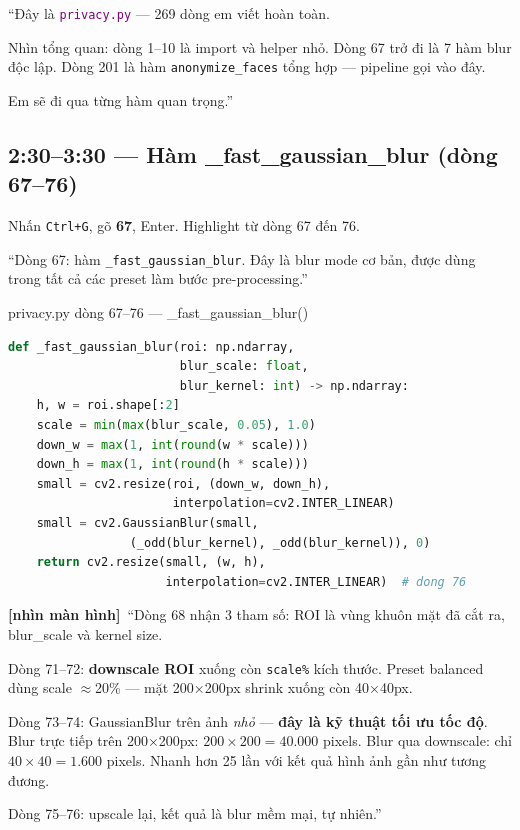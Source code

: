 \documentclass[12pt, a4paper]{article}
\newcommand{\fpath}[1]{\texttt{\textcolor{purple}{#1}}}
\newcommand{\screen}{\textcolor{OliveGreen}{\textbf{[nhìn màn hình]}}}
\begin{document}
\begin{say}
``Đây là \fpath{privacy.py} --- 269 dòng em viết hoàn toàn.

Nhìn tổng quan: dòng 1--10 là import và helper nhỏ.
Dòng 67 trở đi là 7 hàm blur độc lập.
Dòng 201 là hàm \texttt{anonymize\_faces} tổng hợp --- pipeline gọi vào đây.

Em sẽ đi qua từng hàm quan trọng.''
\end{say}

\subsection{2:30--3:30 --- Hàm \_fast\_gaussian\_blur (dòng 67--76)}

\begin{doact}
Nhấn \texttt{Ctrl+G}, gõ \textbf{67}, Enter. Highlight từ dòng 67 đến 76.
\end{doact}

\begin{say}
``Dòng 67: hàm \texttt{\_fast\_gaussian\_blur}.
Đây là blur mode cơ bản, được dùng trong tất cả các preset làm bước pre-processing.''
\end{say}

\begin{code}{privacy.py dòng 67--76 --- \_fast\_gaussian\_blur()}
\begin{lstlisting}[language=Python, firstnumber=67]
def _fast_gaussian_blur(roi: np.ndarray,
                        blur_scale: float,
                        blur_kernel: int) -> np.ndarray:
    h, w = roi.shape[:2]
    scale = min(max(blur_scale, 0.05), 1.0)
    down_w = max(1, int(round(w * scale)))
    down_h = max(1, int(round(h * scale)))
    small = cv2.resize(roi, (down_w, down_h),
                       interpolation=cv2.INTER_LINEAR)
    small = cv2.GaussianBlur(small,
                 (_odd(blur_kernel), _odd(blur_kernel)), 0)
    return cv2.resize(small, (w, h),
                      interpolation=cv2.INTER_LINEAR)  # dong 76
\end{lstlisting}
\end{code}

\begin{say}
\screen\ ``Dòng 68 nhận 3 tham số: ROI là vùng khuôn mặt đã cắt ra, blur\_scale và kernel size.

Dòng 71--72: \textbf{downscale ROI} xuống còn \texttt{scale\%} kích thước.
Preset balanced dùng scale $\approx$20\% --- mặt 200×200px shrink xuống còn 40×40px.

Dòng 73--74: GaussianBlur trên ảnh \textit{nhỏ} --- \textbf{đây là kỹ thuật tối ưu tốc độ}.
Blur trực tiếp trên 200×200px: $200 \times 200 = 40.000$ pixels.
Blur qua downscale: chỉ $40 \times 40 = 1.600$ pixels.
Nhanh hơn 25 lần với kết quả hình ảnh gần như tương đương.

Dòng 75--76: upscale lại, kết quả là blur mềm mại, tự nhiên.''
\end{say}
\end{document}
